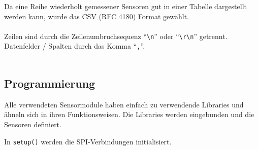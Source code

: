 \documentclass[ngerman]{schoolPres}
\begin{document}
  \begin{frame}[fragile]
    Da eine Reihe wiederholt gemessener Sensoren gut in einer Tabelle dargestellt werden kann, wurde das CSV (RFC 4180) Format gewählt\cite{rfc4180}.\\~\\

    Zeilen sind durch die Zeilenumbruchsequenz \enquote{\texttt{\textbackslash n}} oder \enquote{\texttt{\textbackslash r\textbackslash n}} getrennt.\\
    Datenfelder / Spalten durch das Komma \enquote{\texttt{,}}.\\~\\

    

  \end{frame}

  \subsection{Programmierung}
  \begin{frame}[fragile]
    Alle verwendeten Sensormodule haben einfach zu verwendende Libraries und ähneln sich in ihren Funktionsweisen.
    Die Libraries werden eingebunden und die Sensoren definiert.\\
    
  \end{frame}

  \begin{frame}[fragile]
    In \texttt{setup()} werden die SPI-Verbindungen initialisiert.\\
    
  \end{frame}
\end{document}
